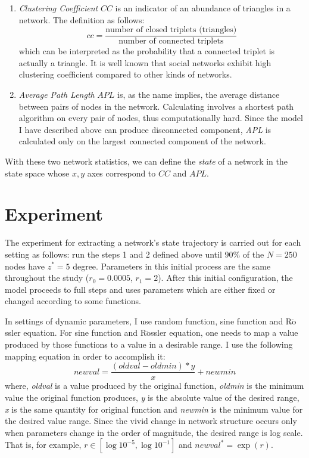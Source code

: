 \documentclass{article}
\begin{document}
 \begin{enumerate}
\item \textit{Clustering Coefficient} $CC$ is an indicator of an abundance of triangles in a network. The definition as follows:
\[
	cc = \frac{\text{number of closed triplets (triangles)}}{\text{number of connected triplets}}
\]
which can be interpreted as the probability that a connected triplet is actually a triangle. It is well known that social networks exhibit high clustering coefficient compared to other kinds of networks.

\item \textit{Average Path Length} $APL$ is, as the name implies, the average distance between pairs of nodes in the network. Calculating involves a shortest path algorithm on every pair of nodes, thus computationally hard. Since the model I have described above can produce disconnected component, \textit{APL} is calculated only on the largest connected component of the network.
\end{enumerate}

With these two network statistics, we can define the \textit{state} of a network in the state space whose $x,y$ axes correspond to $CC$ and $APL$.

\section{Experiment}
The experiment for extracting a network's state trajectory is carried out for each setting as follows: run the steps 1 and 2 defined above until $90\%$ of the $N = 250$ nodes have $z^* = 5$ degree. Parameters in this initial process are the same throughout the study ($r_{0}=0.0005$, $r_{1}=2$).
 After this initial configuration, the model proceeds to full steps and uses parameters which are either fixed or changed according to some functions.
 
 In settings of dynamic parameters, I use random function, sine function and R$\ddot{\text{o}}$ssler equation. For sine function and R$\ddot{\text{o}}$ssler equation, one needs to map a value produced by those functions to a value in a desirable range. I use the following mapping equation in order to accomplish it:
\begin{equation}
 	newval = \frac{(oldval - oldmin)*y}{x} + newmin
\end{equation}
 where, \textit{oldval} is a value produced by the original function,  \textit{oldmin} is the minimum value the original function produces,  \textit{y} is the absolute value of the desired range,  \textit{x} is the same quantity for original function and \textit{newmin} is the minimum value for the desired value range. Since the vivid change in network structure occurs only when parameters change in the order of magnitude, the desired range is log scale. That is, for example, $r \in \left[ \log10^{-5},\log10^{-1}\right]$ and $newval^* = \exp(r)$. 
 
\end{document}
